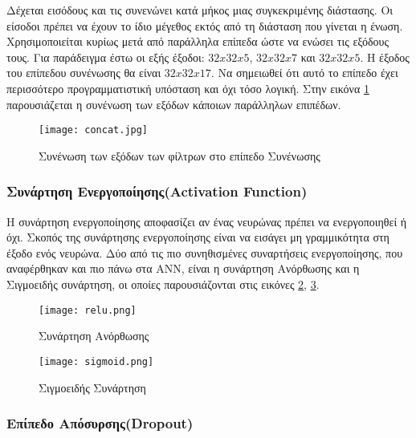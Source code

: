 Δέχεται εισόδους και τις συνενώνει κατά μήκος μιας συγκεκριμένης διάστασης. Οι είσοδοι πρέπει να έχουν το ίδιο μέγεθος εκτός από τη διάσταση που γίνεται η ένωση. Χρησιμοποιείται κυρίως μετά από παράλληλα επίπεδα ώστε να ενώσει τις εξόδους τους. Για παράδειγμα έστω οι εξής έξοδοι: $32x32x5$, $32x32x7$ και $32x32x5$. Η έξοδος του επίπεδου συνένωσης θα είναι $32x32x17$. Να σημειωθεί ότι αυτό το επίπεδο έχει περισσότερο προγραμματιστική υπόσταση και όχι τόσο λογική. Στην εικόνα \ref{figure:concat} παρουσιάζεται η συνένωση των εξόδων κάποιων παράλληλων επιπέδων.


\begin{figure}[!h]
    \centering
      \texttt{[image: concat.jpg]} \caption{Συνένωση των εξόδων των φίλτρων στο επίπεδο Συνένωσης}
\label{figure:concat}  
\end{figure}


\subsubsection{Συνάρτηση Ενεργοποίησης(Activation Function) }
\label{subsubsec:3.1.3.6}


H συνάρτηση ενεργοποίησης αποφασίζει αν ένας νευρώνας πρέπει να ενεργοποιηθεί ή όχι. Σκοπός της συνάρτησης ενεργοποίησης είναι να εισάγει μη γραμμικότητα στη έξοδο ενός νευρώνα. Δύο από τις πιο συνηθισμένες συναρτήσεις ενεργοποίησης, που αναφέρθηκαν και πιο πάνω στα ANN, είναι η συνάρτηση Ανόρθωσης και η Σιγμοειδής συνάρτηση, οι οποίες παρουσιάζονται στις εικόνες \ref{figure:relu}, \ref{figure:sigmoid}. 





\begin{figure}[!h]
    \centering
      \texttt{[image: relu.png]} \caption{Συνάρτηση Ανόρθωσης}
      \label{figure:relu}    
  \end{figure}


\begin{figure}[!h]
    \centering
      \texttt{[image: sigmoid.png]} \caption{Σιγμοειδής Συνάρτηση}
      \label{figure:sigmoid}    
  \end{figure}
  
\subsubsection{Επίπεδο Απόσυρσης(Dropout)}
\label{subsubsec:3.1.3.7}

